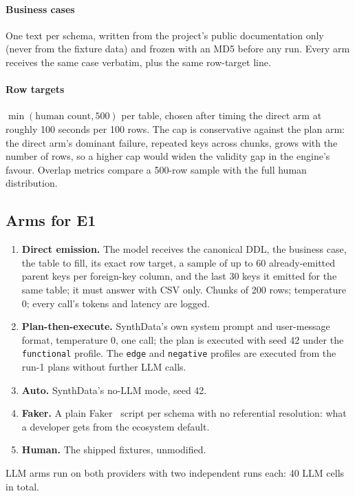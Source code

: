 \documentclass[preprint,12pt]{elsarticle}
\begin{document}
\paragraph{Business cases} One text per schema, written from the project's public documentation only (never from the fixture data) and frozen with an MD5 before any run. Every arm receives the same case verbatim, plus the same row-target line.

\paragraph{Row targets} $\min(\text{human count}, 500)$ per table, chosen after timing the direct arm at roughly 100 seconds per 100 rows. The cap is conservative against the plan arm: the direct arm's dominant failure, repeated keys across chunks, grows with the number of rows, so a higher cap would widen the validity gap in the engine's favour. Overlap metrics compare a 500-row sample with the full human distribution.

\subsection{Arms for E1}
\begin{enumerate}
\item \textbf{Direct emission.} The model receives the canonical DDL, the business case, the table to fill, its exact row target, a sample of up to 60 already-emitted parent keys per foreign-key column, and the last 30 keys it emitted for the same table; it must answer with CSV only. Chunks of 200 rows; temperature 0; every call's tokens and latency are logged.
\item \textbf{Plan-then-execute.} SynthData's own system prompt and user-message format, temperature 0, one call; the plan is executed with seed 42 under the \texttt{functional} profile. The \texttt{edge} and \texttt{negative} profiles are executed from the run-1 plans without further LLM calls.
\item \textbf{Auto.} SynthData's no-LLM mode, seed 42.
\item \textbf{Faker.} A plain Faker~\cite{faker} script per schema with no referential resolution: what a developer gets from the ecosystem default.
\item \textbf{Human.} The shipped fixtures, unmodified.
\end{enumerate}
LLM arms run on both providers with two independent runs each: 40 LLM cells in total.
\end{document}
